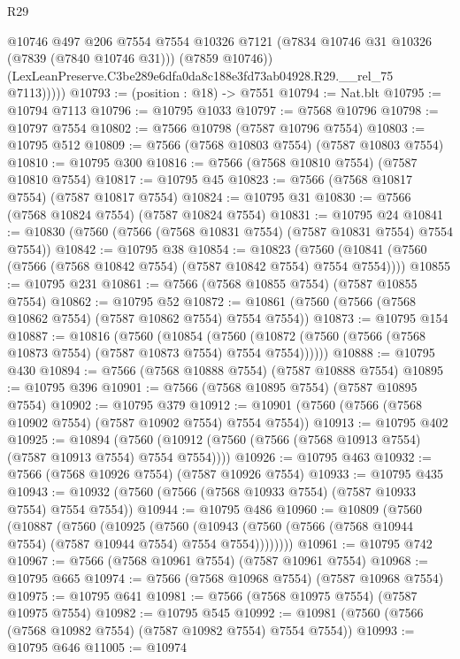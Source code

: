 \begin{lexlean}{R29}
\begin{coremodule}
              @10746
              @497
              @206
              @7554
              @7554
              @10326
              @7121
              (@7834 @10746 @31 @10326 (@7839 (@7840 @10746 @31)))
              (@7859 @10746))
            (LexLeanPreserve.C3be289e6dfa0da8c188e3fd73ab04928.R29.__rel_75 @7113)))))
@10793 := (position : @18) -> @7551
@10794 := Nat.blt
@10795 := @10794 @7113
@10796 := @10795 @1033
@10797 := @7568 @10796
@10798 := @10797 @7554
@10802 := @7566 @10798 (@7587 @10796 @7554)
@10803 := @10795 @512
@10809 := @7566 (@7568 @10803 @7554) (@7587 @10803 @7554)
@10810 := @10795 @300
@10816 := @7566 (@7568 @10810 @7554) (@7587 @10810 @7554)
@10817 := @10795 @45
@10823 := @7566 (@7568 @10817 @7554) (@7587 @10817 @7554)
@10824 := @10795 @31
@10830 := @7566 (@7568 @10824 @7554) (@7587 @10824 @7554)
@10831 := @10795 @24
@10841 := @10830 (@7560 (@7566 (@7568 @10831 @7554) (@7587 @10831 @7554) @7554 @7554))
@10842 := @10795 @38
@10854 := @10823
    (@7560 (@10841 (@7560 (@7566 (@7568 @10842 @7554) (@7587 @10842 @7554) @7554 @7554))))
@10855 := @10795 @231
@10861 := @7566 (@7568 @10855 @7554) (@7587 @10855 @7554)
@10862 := @10795 @52
@10872 := @10861 (@7560 (@7566 (@7568 @10862 @7554) (@7587 @10862 @7554) @7554 @7554))
@10873 := @10795 @154
@10887 := @10816
    (@7560
      (@10854
        (@7560 (@10872 (@7560 (@7566 (@7568 @10873 @7554) (@7587 @10873 @7554) @7554 @7554))))))
@10888 := @10795 @430
@10894 := @7566 (@7568 @10888 @7554) (@7587 @10888 @7554)
@10895 := @10795 @396
@10901 := @7566 (@7568 @10895 @7554) (@7587 @10895 @7554)
@10902 := @10795 @379
@10912 := @10901 (@7560 (@7566 (@7568 @10902 @7554) (@7587 @10902 @7554) @7554 @7554))
@10913 := @10795 @402
@10925 := @10894
    (@7560 (@10912 (@7560 (@7566 (@7568 @10913 @7554) (@7587 @10913 @7554) @7554 @7554))))
@10926 := @10795 @463
@10932 := @7566 (@7568 @10926 @7554) (@7587 @10926 @7554)
@10933 := @10795 @435
@10943 := @10932 (@7560 (@7566 (@7568 @10933 @7554) (@7587 @10933 @7554) @7554 @7554))
@10944 := @10795 @486
@10960 := @10809
    (@7560
      (@10887
        (@7560
          (@10925
            (@7560
              (@10943 (@7560 (@7566 (@7568 @10944 @7554) (@7587 @10944 @7554) @7554 @7554))))))))
@10961 := @10795 @742
@10967 := @7566 (@7568 @10961 @7554) (@7587 @10961 @7554)
@10968 := @10795 @665
@10974 := @7566 (@7568 @10968 @7554) (@7587 @10968 @7554)
@10975 := @10795 @641
@10981 := @7566 (@7568 @10975 @7554) (@7587 @10975 @7554)
@10982 := @10795 @545
@10992 := @10981 (@7560 (@7566 (@7568 @10982 @7554) (@7587 @10982 @7554) @7554 @7554))
@10993 := @10795 @646
@11005 := @10974

\end{coremodule}
\end{lexlean}
